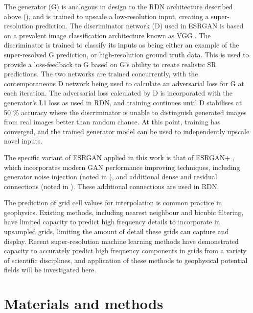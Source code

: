 The generator (G) is analogous in design to the RDN architecture described above (), and is trained to upscale a low-resolution input, creating a super-resolution prediction.
The discriminator network (D) used in ESRGAN is based on a prevalent image classification architecture known as VGG \parencite{simonyanVeryDeepConvolutional2015}.
The discriminator is trained to classify its inputs as being either an example of the super-resolved G prediction, or high-resolution ground truth data.
This is used to provide a loss-feedback to G based on G's ability to create realistic SR predictions.
The two networks are trained concurrently, with the contemporaneous D network being used to calculate an adversarial loss for G at each iteration.
The adversarial loss calculated by D is incorporated with the generator's L1 loss as used in RDN, and training continues until D stabilises at 50 \% accuracy where the discriminator is unable to distinguish generated images from real images better than random chance.
At this point, training has converged, and the trained generator model can be used to independently upscale novel inputs.

The specific variant of ESRGAN applied in this work is that of ESRGAN+ \parencite{rakotonirinaESRGANFurtherImproving2020}, which incorporates modern GAN performance improving techniques, including generator noise injection (noted in ), and additional dense and residual connections (noted in ).
These additional connections are used in RDN\textdaggerdbl{}.

The prediction of grid cell values for interpolation is common practice in geophysics.
Existing methods, including nearest neighbour and bicubic filtering, have limited capacity to predict high frequency details to incorporate in upsampled grids, limiting the amount of detail these grids can capture and display.
Recent super-resolution machine learning methods have demonstrated capacity to accurately predict high frequency components in grids from a variety of scientific disciplines, and application of these methods to geophysical potential fields will be investigated here.

\section{Materials and methods}
